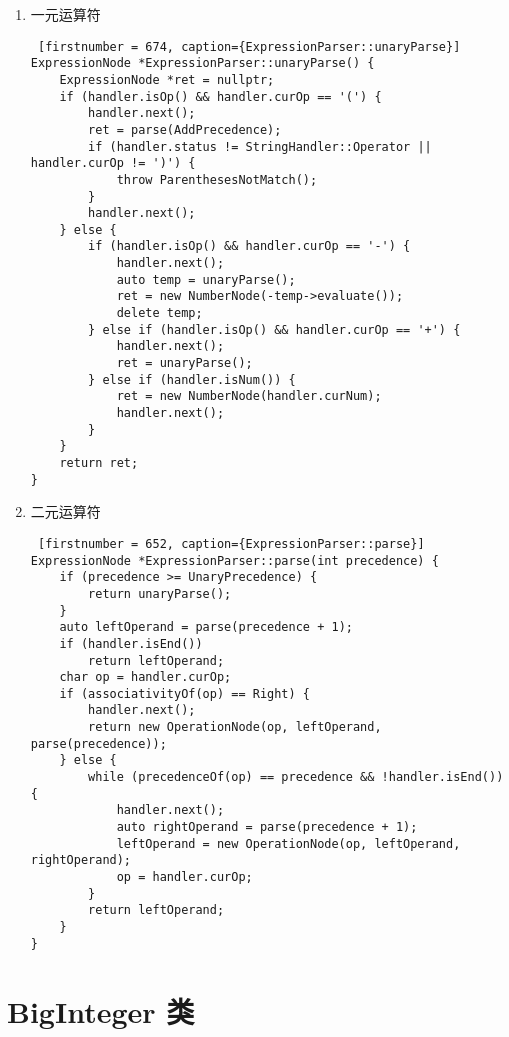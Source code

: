 {
\begin{enumerate}
      \item 一元运算符
\begin{lstlisting} [firstnumber = 674, caption={ExpressionParser::unaryParse}]
ExpressionNode *ExpressionParser::unaryParse() {
    ExpressionNode *ret = nullptr;
    if (handler.isOp() && handler.curOp == '(') {
        handler.next();
        ret = parse(AddPrecedence);
        if (handler.status != StringHandler::Operator || handler.curOp != ')') {
            throw ParenthesesNotMatch();
        }
        handler.next();
    } else {
        if (handler.isOp() && handler.curOp == '-') {
            handler.next();
            auto temp = unaryParse();
            ret = new NumberNode(-temp->evaluate());
            delete temp;
        } else if (handler.isOp() && handler.curOp == '+') {
            handler.next();
            ret = unaryParse();
        } else if (handler.isNum()) {
            ret = new NumberNode(handler.curNum);
            handler.next();
        }
    }
    return ret;
} \end{lstlisting}
      \item 二元运算符
\begin{lstlisting} [firstnumber = 652, caption={ExpressionParser::parse}]
ExpressionNode *ExpressionParser::parse(int precedence) {
    if (precedence >= UnaryPrecedence) {
        return unaryParse();
    }
    auto leftOperand = parse(precedence + 1);
    if (handler.isEnd())
        return leftOperand;
    char op = handler.curOp;
    if (associativityOf(op) == Right) {
        handler.next();
        return new OperationNode(op, leftOperand, parse(precedence));
    } else {
        while (precedenceOf(op) == precedence && !handler.isEnd()) {
            handler.next();
            auto rightOperand = parse(precedence + 1);
            leftOperand = new OperationNode(op, leftOperand, rightOperand);
            op = handler.curOp;
        }
        return leftOperand;
    }
}\end{lstlisting}
      
\end{enumerate}
}

\chapter{BigInteger 类}

